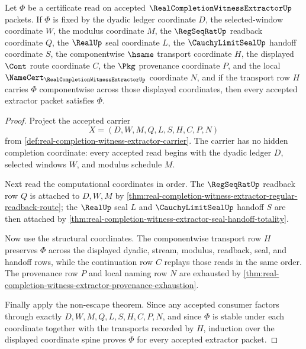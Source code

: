 \begin{theorem}
\label{thm:real-completion-witness-extractor-coordinate-induction}
Let $\Phi$ be a certificate read on accepted
$\RealCompletionWitnessExtractorUp$ packets. If $\Phi$ is fixed by the
dyadic ledger coordinate $D$, the selected-window coordinate $W$, the modulus
coordinate $M$, the $\RegSeqRatUp$ readback coordinate $Q$, the $\RealUp$
seal coordinate $L$, the $\CauchyLimitSealUp$ handoff coordinate $S$, the
componentwise $\hsame$ transport coordinate $H$, the displayed $\Cont$ route
coordinate $C$, the $\Pkg$ provenance coordinate $P$, and the local
$\NameCert_{\RealCompletionWitnessExtractorUp}$ coordinate $N$, and if the
transport row $H$ carries $\Phi$ componentwise across those displayed
coordinates, then every accepted extractor packet satisfies $\Phi$.
\end{theorem}
\begin{proof}
Project the accepted carrier
$$
X=(D,W,M,Q,L,S,H,C,P,N)
$$
from \autoref{def:real-completion-witness-extractor-carrier}. The carrier has
no hidden completion coordinate: every accepted read begins with the dyadic
ledger $D$, selected windows $W$, and modulus schedule $M$.

Next read the computational coordinates in order. The $\RegSeqRatUp$ readback
row $Q$ is attached to $D,W,M$ by
\autoref{thm:real-completion-witness-extractor-regular-readback-route}; the
$\RealUp$ seal $L$ and $\CauchyLimitSealUp$ handoff $S$ are then attached by
\autoref{thm:real-completion-witness-extractor-seal-handoff-totality}.

Now use the structural coordinates. The componentwise transport row $H$
preserves $\Phi$ across the displayed dyadic, stream, modulus, readback, seal,
and handoff rows, while the continuation row $C$ replays those reads in the
same order. The provenance row $P$ and local naming row $N$ are exhausted by
\autoref{thm:real-completion-witness-extractor-provenance-exhaustion}.

Finally apply the non-escape theorem. Since any accepted consumer factors
through exactly $D,W,M,Q,L,S,H,C,P,N$, and since $\Phi$ is stable under each
coordinate together with the transports recorded by $H$, induction over the
displayed coordinate spine proves $\Phi$ for every accepted extractor packet.
\end{proof}

